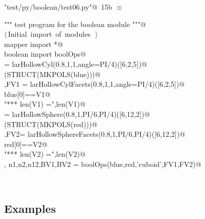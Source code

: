 \documentclass[11pt,oneside]{article}	%
\begin{document}
\begin{flushleft} \small
\begin{minipage}{\linewidth} \label{scrap25}
\protect{}\verb@"test/py/boolean/test06.py"@\nobreak\ {\footnotesize 15b }$\equiv$
\vspace{-1ex}
\begin{list}{}{} \item
\mbox{}\verb@""" test program for the boolean module """@\\
\mbox{}\verb@@\hbox{$\langle\,$Initial import of modules\nobreak\ {\footnotesize {}}$\,\rangle$}\verb@@\\
\mbox{}\verb@from mapper import *@\\
\mbox{}\verb@from boolean import boolOps@\\
\mbox{}\verb@blue = larHollowCyl(0.8,1,1,angle=PI/4)([6,2,5])@\\
\mbox{}\verb@VIEW(STRUCT(MKPOLS(blue)))@\\
\mbox{},FV1 = larHollowCylFacets(0.8,1,1,angle=PI/4)([6,2,5])@\\
\mbox{}\verb@assert blue[0]==V1@\\
\mbox{}\verb@print "*** len(V1) =",len(V1)@\\
\mbox{}\verb@red = larHollowSphere(0.8,1,PI/6,PI/4)([6,12,2])@\\
\mbox{}\verb@VIEW(STRUCT(MKPOLS(red)))@\\
\mbox{},FV2= larHollowSphereFacets(0.8,1,PI/6,PI/4)([6,12,2])@\\
\mbox{}\verb@assert red[0]==V2@\\
\mbox{}\verb@print "*** len(V2) =",len(V2)@\\
\mbox{}\verb@V, n1,n2,n12,BV1,BV2 = boolOps(blue,red,'cuboid',FV1,FV2)@\\
\mbox{}\verb@@{\NWsep}
\end{list}
\vspace{-2ex}
\end{minipage}\\[4ex]
\end{flushleft}

\subsection{Examples}
\appendix
\end{document}
